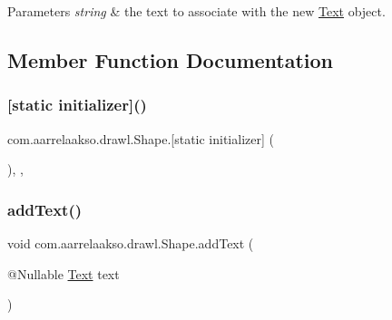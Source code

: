 \begin{DoxyParams}{Parameters}
{\em string} & the text to associate with the new \hyperlink{classcom_1_1aarrelaakso_1_1drawl_1_1_text}{Text} object. \\
\hline
\end{DoxyParams}


\subsection{Member Function Documentation}
\mbox{\label{classcom_1_1aarrelaakso_1_1drawl_1_1_shape_ad2adcb85374cf5d6d59429628314e8d1}} 
\subsubsection{\texorpdfstring{[static initializer]()}{[static initializer]()}}
{\footnotesize\ttfamily com.\+aarrelaakso.\+drawl.\+Shape.\mbox{[}static initializer\mbox{]} (\begin{DoxyParamCaption}{ }\end{DoxyParamCaption})\hspace{0.3cm}{\ttfamily [static]}, {\ttfamily [package]}, {\ttfamily [inherited]}}

\mbox{\label{classcom_1_1aarrelaakso_1_1drawl_1_1_shape_a9784264f6abcf623b2774d6ef2a53fdc}} 
\subsubsection{\texorpdfstring{add\+Text()}{addText()}}
{\footnotesize\ttfamily void com.\+aarrelaakso.\+drawl.\+Shape.\+add\+Text (\begin{DoxyParamCaption}\item[{@Nullable \hyperlink{classcom_1_1aarrelaakso_1_1drawl_1_1_text}{Text}}]{text }\end{DoxyParamCaption})\hspace{0.3cm}{\ttfamily [inherited]}}



